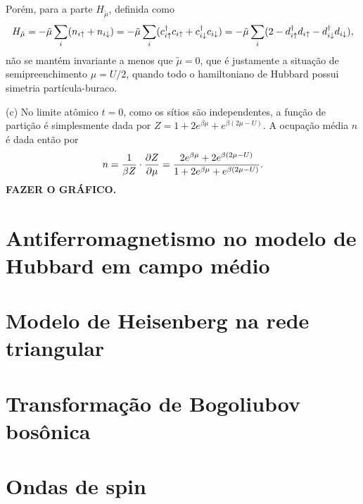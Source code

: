 \documentclass[a4paper,10pt]{article}
\begin{document}
Porém, para a parte $H_{\tilde{\mu}}$, definida como
$$
H_{\tilde{\mu}} =
-\tilde{\mu} \sum_{i} (n_{i\uparrow} + n_{i\downarrow}) =
-\tilde{\mu} \sum_{i} (c_{i\uparrow}^\dagger c_{i\uparrow} + c_{i\downarrow}^\dagger c_{i\downarrow}) =
-\tilde{\mu} \sum_{i} (2 - d_{i\uparrow}^\dagger d_{i\uparrow} - d_{i\downarrow}^\dagger d_{i\downarrow}),
$$
não se mantém invariante a menos que $\tilde{\mu} = 0$, que é justamente a situação de semipreenchimento $\mu = U/2$, quando todo o hamiltoniano de Hubbard possui simetria partícula-buraco.

\n

(c) No limite atômico $t = 0$, como os sítios são independentes, a função de partição é simplesmente dada por $Z = 1 + 2 e^{\beta \mu} + e^{\beta(2\mu - U)}$. A ocupação média $n$ é dada então por
$$
n = \frac{1}{\beta Z} \cdot \pdv{Z}{\mu} =
\frac{2 e^{\beta\mu} + 2 e^{\beta(2\mu-U)}}{1 + 2 e^{\beta \mu} + e^{\beta(2\mu - U)}}.
$$
\textbf{FAZER O GRÁFICO.}




\pagebreak

\section{Antiferromagnetismo no modelo de Hubbard em campo médio}


\pagebreak

\section{Modelo de Heisenberg na rede triangular}


\pagebreak

\section{Transformação de Bogoliubov bosônica}



\pagebreak

\section{Ondas de spin}
\end{document}

